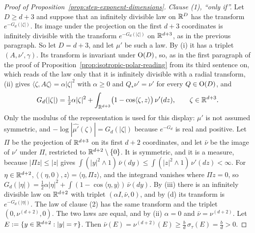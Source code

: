 \begin{proof}[Proof of Proposition~\ref{prop:step-exponent-dimensions}]
\emph{Clause (1), ``only if''.} Let $D \ge d + 3$ and suppose that an infinitely divisible law on
$\mathbb{R}^D$ has the transform $e^{-G_d(|\zeta|)}$. Its image under the projection on the first
$d + 3$ coordinates is infinitely divisible with the transform $e^{-G_d(|\zeta|)}$ on
$\mathbb{R}^{d+3}$, as in the previous paragraph. So let $D = d + 3$, and let $\mu'$ be such a law. By
(i) it has a triplet $(A,\nu',\gamma)$. Its transform is invariant under $\mathrm{O}(D)$,
so, as in the first paragraph of the proof of Proposition~\ref{prop:isotropic-polar-reading} from its
third sentence on, which reads of
the law only that it is infinitely divisible with a radial transform, (ii) gives
$\langle\zeta,A\zeta\rangle = \alpha|\zeta|^2$ with $\alpha \ge 0$ and $Q_*\nu' = \nu'$ for every
$Q \in \mathrm{O}(D)$, and
\[
  G_d(|\zeta|) = \tfrac12\alpha|\zeta|^2
     + \int_{\mathbb{R}^{d+3}}\bigl(1 - \cos\langle\zeta,z\rangle\bigr)\,\nu'(dz), \qquad \zeta \in \mathbb{R}^{d+3} .
\]
Only the modulus of the representation is used for this display: $\mu'$ is not assumed
symmetric, and $-\log|\widehat{\mu'}(\zeta)| = G_d(|\zeta|)$ because $e^{-G_d}$ is real and
positive.
Let $\Pi$ be the projection of $\mathbb{R}^{d+3}$ on its first $d + 2$ coordinates, and let $\bar\nu$ be
the image of $\nu'$ under $\Pi$, restricted to $\mathbb{R}^{d+2} \setminus \{0\}$. It is symmetric, and
it is a \Levy{} measure, because $|\Pi z| \le |z|$ gives
$\int(|y|^2 \wedge 1)\,\bar\nu(dy) \le \int(|z|^2 \wedge 1)\,\nu'(dz) < \infty$. For
$\eta \in \mathbb{R}^{d+2}$, $\langle(\eta,0),z\rangle = \langle\eta,\Pi z\rangle$, and the integrand
vanishes where $\Pi z = 0$, so
$G_d(|\eta|) = \tfrac12\alpha|\eta|^2 + \int(1 - \cos\langle\eta,y\rangle)\,\bar\nu(dy)$. By
(iii) there is an infinitely divisible law on $\mathbb{R}^{d+2}$ with triplet
$(\alpha I,\bar\nu,0)$, and by (d) its transform is $e^{-G_d(|\eta|)}$. The law of clause (2) has the
same transform and the triplet $(0,\nu^{(d+2)},0)$. The two laws are equal, and by
(ii) $\alpha = 0$ and $\bar\nu = \nu^{(d+2)}$. Let
$E := \{y \in \mathbb{R}^{d+2} : |y| = \tau\}$. Then
$\bar\nu(E) = \nu^{(d+2)}(E) \ge \tfrac{b}{d}\,\sigma_\tau(E) = \tfrac{b}{d} > 0$.


\end{proof}
